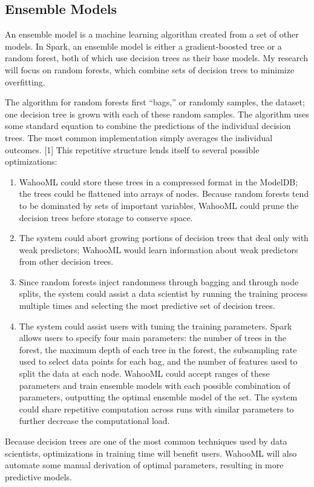 \documentclass[../proposal.tex]{subfiles}
\begin{document}
\subsection{Ensemble Models}

An ensemble model is a machine learning algorithm created from a set of other
models. In Spark, an ensemble model is either a gradient-boosted tree or a
random forest, both of which use decision trees as their base models. My
research will focus on random forests, which combine sets of decision
trees to minimize overfitting.

The algorithm for random forests first ``bags,'' or randomly samples, the
dataset; one decision tree is grown with each of these random samples. The
algorithm uses some standard equation to combine the predictions of the
individual decision trees. The most common implementation simply averages the
individual outcomes. [1] This repetitive structure lends itself to several
possible optimizations:

\begin{enumerate}[topsep=0pt,itemsep=-1ex,partopsep=1ex,parsep=1ex]

\item WahooML could store these trees in a compressed format in the ModelDB;
the trees could be flattened into arrays of nodes. Because random forests
tend to be dominated by sets of important variables, WahooML could prune the
decision trees before storage to conserve space.

\item The system could
abort growing portions of decision trees that deal only with weak predictors;
WahooML would learn information about weak predictors from other decision
trees.

\item Since random forests inject randomness through bagging and through node
splits, the system could assist a data scientist by running the training
process multiple times and selecting the most predictive set of decision trees.

\item The system could assist users with tuning the training parameters. Spark
allows users to specify four main parameters: the number of trees in the forest,
the maximum depth of each tree in the forest, the subsampling rate used to
select data points for each bag, and the number of features used to split the data
at each node. WahooML could accept ranges of these parameters and train
ensemble models with each possible combination of parameters, outputting the
optimal ensemble model of the set. The system could share repetitive
computation across runs with similar parameters to further decrease the
computational load.

\end{enumerate}

Because decision trees are one of the most common techniques used by data
scientists, optimizations in training time will benefit users. WahooML will
also automate some manual derivation of optimal parameters, resulting in more
predictive models.
\end{document}

